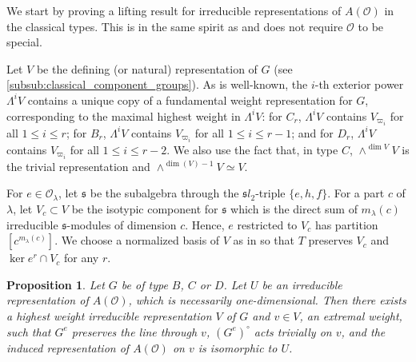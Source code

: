 \documentclass{amsart}
\newtheorem{proposition}[theorem]{Proposition}
\theoremstyle{definition}
\newcommand{\C}{\mathbb{C}}
\newcommand{\fs}{\mathfrak{s}}
\newcommand{\0}{\mathcal{O}}
\begin{document}


We start by proving a lifting result for irreducible representations of $A(\0)$ in the classical types.
This is in the same spirit as \cite[Proposition 3.1]{Sommers:Localsystems} and does not require $\0$ to be special.

Let $V$ be the defining (or natural) representation of $G$ (see \ref{subsub:classical_component_groups}).  
As is well-known, 
the $i$-th exterior power $\Lambda^iV$ contains a unique copy of a fundamental weight representation for $G$, corresponding to the maximal highest 
weight in $\Lambda^iV$:
for $C_r$, $\Lambda^iV$ contains $V_{\varpi_i}$ for all $1 \leq i \leq r$;
for $B_r$, $\Lambda^iV$ contains $V_{\varpi_i}$ for all $1 \leq i \leq r-1$;
and for $D_r$, $\Lambda^iV$ contains $V_{\varpi_i}$
for all $1 \leq i \leq r-2$.
We also use the fact that, in type $C$, $\wedge^{\dim V}V$ is the trivial representation and $\wedge^{\dim(V)-1} V \simeq V$.

For $e \in \0_\lambda$, let $\fs$ be the subalgebra through
the $\mathfrak sl_2$-triple $\{e,h,f\}$.
For a part $c$ of $\lambda$, let
$V_c \subset V$ be the isotypic component for $\fs$ which is 
the direct sum of $m_\lambda(c)$ irreducible $\fs$-modules of dimension $c$. 
Hence, $e$ restricted to $V_c$ has partition $[c^{m_\lambda(c)}]$. 
We choose a normalized basis of $V$ as in \cite[\S 3.1]{Sommers:Localsystems}
so that $T$ preserves $V_c$
and $\ker e^r \cap V_c$ for any $r$.  



\begin{proposition}\label{prop:lifting_classical}
Let $G$ be of type $B$, $C$ or $D$. 
Let $U$ be an irreducible representation of $A(\0)$, which is necessarily one-dimensional.  Then there exists a highest weight irreducible representation $V$ of $G$ and $v \in V$, an extremal weight, such that $G^e$ preserves the line through $v$, $(G^{e})^\circ$ acts trivially on $v$, and the induced representation 
of $A(\0)$ on $v$ is isomorphic to $U$.    
\end{proposition}
\end{document}

